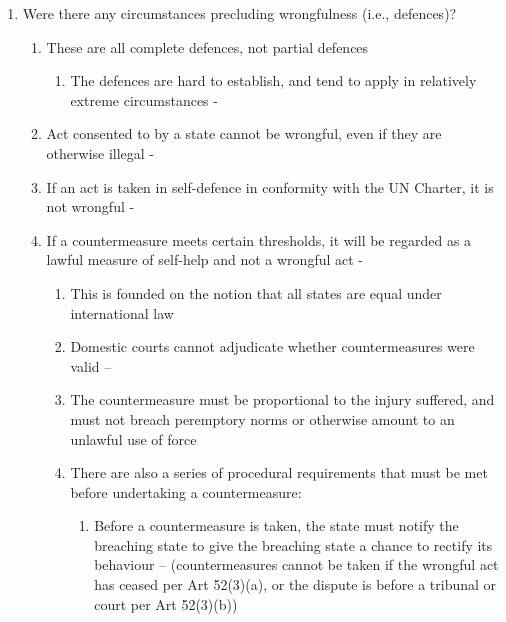 \begin{enumerate}
    \item Were there any circumstances precluding wrongfulness (i.e., defences)?
    \begin{enumerate}
        \item These are all complete defences, not partial defences
        \begin{enumerate}
            \item The defences are hard to establish, and tend to apply in relatively extreme circumstances - 
        \end{enumerate}
        \item Act consented to by a state cannot be wrongful, even if they are otherwise illegal - 
        \item If an act is taken in self-defence in conformity with the UN Charter, it is not wrongful - 
        \item If a countermeasure meets certain thresholds, it will be regarded as a lawful measure of self-help and not a wrongful act -
        \begin{enumerate}
            \item This is founded on the notion that all states are equal under international law
            \item Domestic courts cannot adjudicate whether countermeasures were valid -- 
            \item The countermeasure must be proportional to the injury suffered, and must not breach peremptory norms or otherwise amount to an unlawful use of force
            \item There are also a series of procedural requirements that must be met before undertaking a countermeasure:
            \begin{enumerate}
                \item Before a countermeasure is taken, the state must notify the breaching state to give the breaching state a chance to rectify its behaviour --  (countermeasures cannot be taken if the wrongful act has ceased per Art 52(3)(a), or the dispute is before a tribunal or court per Art 52(3)(b))

\end{enumerate}
\end{enumerate}
\end{enumerate}
\end{enumerate}
